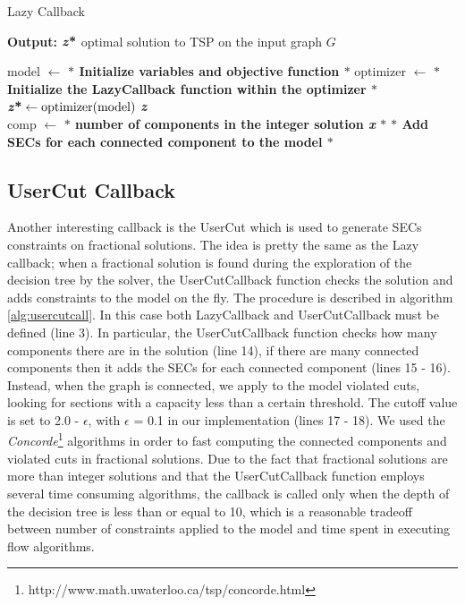 \begin{algorithm}
    \caption{Lazy Callback}\label{Lazy Callback}
    \hspace*{\algorithmicindent} \textbf{Output:} $\textbf{\textit{z}\text{*}} $ optimal solution to TSP on the input graph $G$
    \begin{algorithmic}[1]
  \State model $ \leftarrow $ \textbf{$\ast$ Initialize variables and objective function $\ast$ }
  \State optimizer $ \leftarrow $ \textbf{$\ast$ Initialize the LazyCallback function within the optimizer $\ast$ }
  \State $\textbf{\textit{z}\text{*}} \gets \text{optimizer(model)}$
  \State \Return \textbf{\textit{z}\text{*}}
\EndFunction
\\
  \State comp $ \leftarrow $ \textbf{$\ast$ number of components in the integer solution \textit{x} $\ast$ }
	\State \textbf{ $\ast$ Add SECs for each connected component to the model $\ast$ }
	\EndIf  
	\State \Return 
	\EndFunction

    \end{algorithmic}
     \label{alg:lazycall}
    \end{algorithm}

\subsection{UserCut Callback}
Another interesting callback is the UserCut which is used to generate SECs constraints on fractional solutions. The idea is pretty the same as the Lazy callback; when a fractional solution is found during the exploration of the decision tree by the solver, the UserCutCallback function checks the solution and adds constraints to the model on the fly. The procedure is described in algorithm \ref{alg:usercutcall}. In this case both LazyCallback and UserCutCallback must be defined (line 3). In particular, the UserCutCallback function checks how many components there are in the solution (line 14), if there are many connected components then it adds the SECs for each connected component (lines 15 - 16). Instead, when the graph is connected, we apply to the model violated cuts, looking for sections with a capacity less than a certain threshold. The cutoff value is set to 2.0 - $\epsilon$, with $\epsilon$ = 0.1 in our implementation (lines 17 - 18). We used the \textit{Concorde}\footnote{http://www.math.uwaterloo.ca/tsp/concorde.html} algorithms in order to fast computing the connected components and violated cuts in fractional solutions. Due to the fact that fractional solutions are more than integer solutions and that the UserCutCallback function employs several time consuming algorithms, the callback is called only when the depth of the decision tree is less than or equal to 10, which is a reasonable tradeoff between number of constraints applied to the model and time spent in executing flow algorithms.



